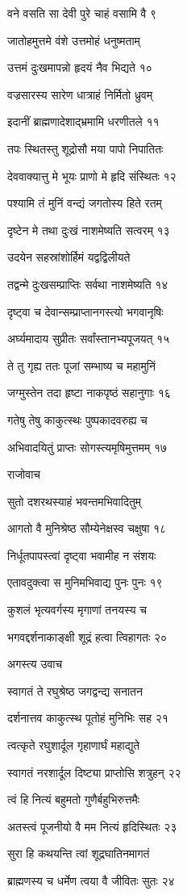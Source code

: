 वने वसति सा देवी पुरे चाहं वसामि वै ९

जातोहमुत्तमे वंशे उत्तमोहं धनुष्मताम्

उत्तमं दुःखमापन्नो हृदयं नैव भिद्यते १०

वज्रसारस्य सारेण धात्राहं निर्मितो ध्रुवम्

इदानीं ब्राह्मणादेशाद्भ्रमामि धरणीतले ११

तपः स्थितस्तु शूद्रोसौ मया पापो निपातितः

देववाक्यात्तु मे भूयः प्राणो मे हृदि संस्थितः १२

पश्यामि तं मुनिं वन्द्यं जगतोस्य हिते रतम्

दृष्टेन मे तथा दुःखं नाशमेष्यति सत्वरम् १३

उदयेन सहस्रांशोर्हिमं यद्वद्विलीयते

तद्वन्मे दुःखसम्प्राप्तिः सर्वथा नाशमेष्यति १४

दृष्ट्वा च देवान्सम्प्राप्तानगस्त्यो भगवानृषिः

अर्घ्यमादाय सुप्रीतः सर्वांस्तानभ्यपूजयत् १५

ते तु गृह्य ततः पूजां सम्भाष्य च महामुनिं

जग्मुस्तेन तदा हृष्टा नाकपृष्ठं सहानुगाः १६

गतेषु तेषु काकुत्स्थः पुष्पकादवरुह्य च

अभिवादयितुं प्राप्तः सोगस्त्यमृषिमुत्तमम् १७

राजोवाच

सुतो दशरथस्याहं भवन्तमभिवादितुम्

आगतो वै मुनिश्रेष्ठ सौम्येनेक्षस्व चक्षुषा १८

निर्धूतपापस्त्वां दृष्ट्वा भवामीह न संशयः

एतावदुक्त्वा स मुनिमभिवाद्य पुनः पुनः १९

कुशलं भृत्यवर्गस्य मृगाणां तनयस्य च

भगवद्दर्शनाकाङ्क्षी शूद्रं हत्वा त्विहागतः २०

अगस्त्य उवाच

स्वागतं ते रघुश्रेष्ठ जगद्वन्द्य सनातन

दर्शनात्तव काकुत्स्थ पूतोहं मुनिभिः सह २१

त्वत्कृते रघुशार्दूल गृहाणार्घं महाद्युते

स्वागतं नरशार्दूल दिष्ट्या प्राप्तोसि शत्रुहन् २२

त्वं हि नित्यं बहुमतो गुणैर्बहुभिरुत्तमैः

अतस्त्वं पूजनीयो वै मम नित्यं हृदिस्थितः २३

सुरा हि कथयन्ति त्वां शूद्रघातिनमागतं

ब्राह्मणस्य च धर्मेण त्वया वै जीवितः सुतः २४

